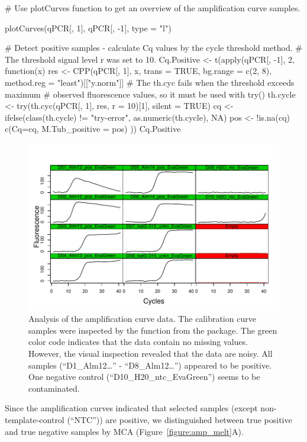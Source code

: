 \begin{example}
# Use plotCurves function to get an overview of the amplification curve samples.

plotCurves(qPCR[, 1], qPCR[, -1], type = "l")

# Detect positive samples - calculate Cq values by the cycle threshold method. 
# The threshold signal level r was set to 10.
Cq.Positive <- t(apply(qPCR[, -1], 2, function(x)
{
  res <- CPP(qPCR[, 1], x, trans = TRUE, bg.range = c(2, 8),
             method.reg = "least")[["y.norm"]]
  # The th.cyc fails when the threshold exceeds maximum 
  # observed fluorescence values, so it must be used with try()
  th.cycle <- try(th.cyc(qPCR[, 1], res, r = 10)[1], silent = TRUE)
  cq <- ifelse(class(th.cycle) != "try-error", as.numeric(th.cycle), NA)
  pos <- !is.na(cq)
  c(Cq=cq, M.Tub_positive = pos)
}
))
Cq.Positive
\end{example}

\begin{figure}[htbp]
  \centering
  \includegraphics[clip=true, width=12cm]{figures/plotCurves.pdf}
  \caption{Analysis of the amplification curve data. The calibration curve 
samples were inspected by the  function from the 
 package. The green color code indicates that the data contain 
no missing values. However, the visual inspection revealed that the data are 
noisy. All samples (``D1\_Alm12\ldots'' - ``D8\_Alm12\ldots'') appeared to be 
positive. One negative control (``D10\_H20\_ntc\_EvaGreen'') 
seems to be contaminated.}
  \label{figure:plotCurves}
\end{figure}

Since the amplification curves indicated that selected samples (except 
non-template-control (``NTC'')) are positive, we distinguished between true 
positive and true negative samples by MCA (Figure~\ref{figure:amp_melt}A).

